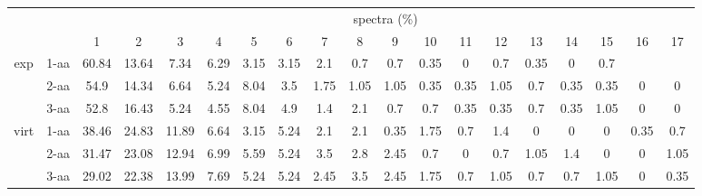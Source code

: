 \begin{table}[h]\tiny
\vspace{3mm}
{\centering
\begin{center}
\begin{tabular}{|c|l|c|c|c|c|c|c|c|c|c|c|c|c|c|c|c|c|c|}
  \hline
  \multicolumn{2}{|c|}{ } & \multicolumn{ 17 }{|c|}{ spectra (\%)} \\
  \cline{3- 19}
  \multicolumn{2}{|c|}{ }  & 1 & 2 & 3 & 4 & 5 & 6 & 7 & 8 & 9 & 10 & 11 & 12 & 13 & 14 & 15 & 16 & 17\\
  \hline
  \multirow{3}{*}{exp}
&  1-aa  & 60.84 & 13.64 & 7.34 & 6.29 & 3.15 & 3.15 & 2.1 & 0.7 & 0.7 & 0.35 & 0 & 0.7 & 0.35 & 0 & 0.7 &  & \\
&  2-aa  & 54.9 & 14.34 & 6.64 & 5.24 & 8.04 & 3.5 & 1.75 & 1.05 & 1.05 & 0.35 & 0.35 & 1.05 & 0.7 & 0.35 & 0.35 & 0 & 0\\
&  3-aa  & 52.8 & 16.43 & 5.24 & 4.55 & 8.04 & 4.9 & 1.4 & 2.1 & 0.7 & 0.7 & 0.35 & 0.35 & 0.7 & 0.35 & 1.05 & 0 & 0\\
 \hline
  \multirow{3}{*}{virt} 
&  1-aa  & 38.46 & 24.83 & 11.89 & 6.64 & 3.15 & 5.24 & 2.1 & 2.1 & 0.35 & 1.75 & 0.7 & 1.4 & 0 & 0 & 0 & 0.35 & 0.7\\
&  2-aa  & 31.47 & 23.08 & 12.94 & 6.99 & 5.59 & 5.24 & 3.5 & 2.8 & 2.45 & 0.7 & 0 & 0.7 & 1.05 & 1.4 & 0 & 0 & 1.05\\
&  3-aa  & 29.02 & 22.38 & 13.99 & 7.69 & 5.24 & 5.24 & 2.45 & 3.5 & 2.45 & 1.75 & 0.7 & 1.05 & 0.7 & 0.7 & 1.05 & 0 & 0.35\\
 \hline
\end{tabular}
\end{center}
\par}
\centering

\vspace{3mm}
\label{table:longest-correct-d-tag}
\end{table}
